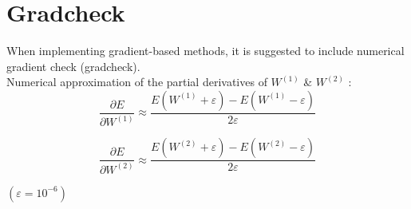 \documentclass[11pt]{article}
\begin{document}
\newpage

\section{Gradcheck}

When implementing gradient-based methods, it is suggested to include numerical gradient check (gradcheck). \\

\noindent Numerical approximation of the partial derivatives of $W^{(1)}$ \& $W^{(2)}$ : \\


\begin{equation} \frac{\partial E}{\partial W^{(1)}} \approx \frac{E{(W^{(1)} + ε)} - E{(W^{(1)} - ε)}}{2ε} \end{equation}

\begin{equation} \frac{\partial E}{\partial W^{(2)}} \approx \frac{E{(W^{(2)} + ε)} - E{(W^{(2)} - ε)}}{2ε} \end{equation}

${( ε = 10^{-6})} $
\end{document}
